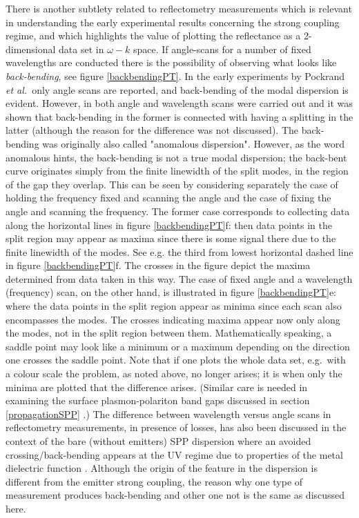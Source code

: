 \documentclass[12pt]{iopart}
\begin{document}
There is another subtlety related to reflectometry measurements which is relevant in understanding the early experimental results concerning the strong coupling regime, and which highlights the value of plotting the reflectance as a 2-dimensional data set in $\omega-k$ space. If angle-scans for a number of fixed wavelengths are conducted there is the possibility of observing what looks like {\it back-bending}, see figure \ref{backbendingPT}. In the early experiments \cite{Pockrand1978,Pockrand21978} by Pockrand {\it et al.}\ only angle scans are reported, and back-bending of the modal dispersion is evident. However, in \cite{Pockrand1982} both angle and wavelength scans were carried out and it was shown that back-bending in the former is connected with having a splitting in the latter (although the reason for the difference was not discussed). The back-bending was originally also called "anomalous dispersion". However, as the word anomalous hints, the back-bending is not a true modal dispersion; the back-bent curve originates simply from the finite linewidth of the split modes, in the region of the gap they overlap.  
This can be seen by considering separately the case of holding the frequency fixed and scanning the angle and the case of fixing the angle and scanning the frequency. The former case corresponds to collecting data along the horizontal lines in figure  \ref{backbendingPT}f: then data points in the split region may appear as maxima since there is some signal there due to the finite linewidth of the modes. See e.g. the third from lowest horizontal dashed line in figure \ref{backbendingPT}f. The crosses in the figure depict the maxima determined from data taken in this way. The case of fixed angle and a wavelength (frequency) scan, on the other hand, is illustrated in figure \ref{backbendingPT}e: where the data points in the split region appear as minima since each scan also encompasses the modes. The crosses indicating maxima appear now only along the modes, not in the split region between them.
Mathematically speaking, a saddle point may look like a minimum or a maximum depending on the direction one crosses the saddle point. Note that if one plots the whole data set, e.g.\ with a colour scale the problem, as noted above, no longer arises; it is when only the minima are plotted that the difference arises. (Similar care is needed in examining the surface plasmon-polariton band gaps discussed in section \ref{propagationSPP} \cite{Barnes_PRB_1996_54_6227}.) The difference between wavelength versus angle scans in reflectometry measurements, in presence of losses, has also been discussed in the context of the bare (without emitters) SPP dispersion where an avoided crossing/back-bending appears at the UV regime due to properties of the metal dielectric function \cite{Alexander_PRL_1974_32_154}. Although the origin of the feature in the dispersion is different from the emitter strong coupling, the reason why one type of measurement produces back-bending and other one not is the same as discussed here.
\end{document}
